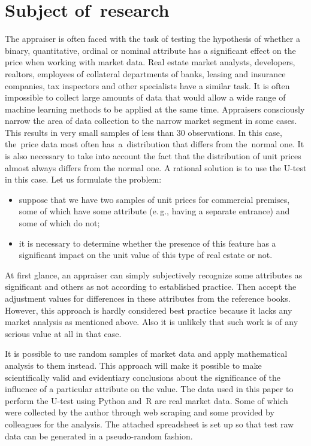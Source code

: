 \documentclass[]{scrreprt}
\begin{document}
\chapter{Subject of~research}
The appraiser is often faced with the task of testing the hypothesis of whether a binary, quantitative, ordinal or nominal attribute has a significant effect on the price when working with market data. Real estate market analysts, developers, realtors, employees of collateral departments of banks, leasing and insurance companies, tax inspectors and other specialists have a similar task. It is often impossible to collect large amounts of data that would allow a wide range of machine learning methods to be applied at the same time. Appraisers consciously narrow the area of data collection to the narrow market segment in some cases. This results in very small samples of less than 30 observations. In this case, the~price data most often has~a~distribution that differs from the~normal one. It is also necessary to take into account the fact that the distribution of unit prices almost always differs from the normal one. A rational solution is to use the U-test in this case. Let us formulate the problem:
\begin{itemize}
	\item suppose that we have two samples of unit prices for commercial premises, some of which have some attribute (e.\,g., having a separate entrance) and some of which do not;
	\item it is necessary to determine whether the presence of this feature has a significant impact on the unit value of this type of real estate or not.
\end{itemize}
At first glance, an appraiser can simply subjectively recognize some attributes as significant and others as not according to established practice. Then accept the adjustment values for differences in these attributes from the reference books. However, this approach is hardly considered best practice because it lacks any market analysis as mentioned above. Also it is unlikely that such work is of any serious value at all in that case.

It is possible to use random samples of market data and apply mathematical analysis to them instead. This approach will make it possible to make scientifically valid and evidentiary conclusions about the significance of the influence of a particular attribute on the value. The data used in this paper to perform the U-test using Python and~R are real market data. Some of which were collected by the author through web scraping and some provided by colleagues for the analysis. The attached spreadsheet is set up so that test raw data can be generated in a pseudo-random fashion.
\end{document}
